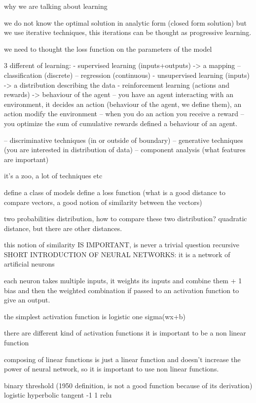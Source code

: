 \documentclass{article}
\begin{document}
why we are talking about learning 

we do not know the optimal solution in analytic form (closed form solution)
but we use iterative techniques, this iterations can be thought as progressive
learning. 

we need to thought the loss function on the parameters of the model 


3 different of learning:
- supervised learning (inputs+outputs) -> a mapping
 -- classification (discrete)
 -- regression (continuous)
- unsupervised learning (inputs) -> a distribution describing the data
- reinforcement learning (actions and rewards) -> behaviour of the agent
--  you have an agent interacting with an environment, it decides an action
(behaviour of the agent, we define them), an action modify the environment 
-- when you do an action you receive a reward 
-- you optimize the sum of cumulative rewards defined a behaviour of an agent.

-- discriminative techniques (in or outside of boundary)
-- generative techniques (you are interested in distribution of data)
-- component analysis (what features are important)

it's a zoo, a lot of techniques etc 

define a class of models 
define a loss function (what is a good distance to compare vectors, a good
notion of similarity between the vectors)

two probabilities distribution, how to compare these two distribution?
quadratic distance, but there are other distances.

this notion of similarity IS IMPORTANT, is never a trivial question 
recursive
SHORT INTRODUCTION OF NEURAL NETWORKS:
it is a network of artificial neurons

each neuron takes multiple inputs, it weights its inputs and combine them + 1
bias and then the weighted combination if passed to an activation function to
give an output.

the simplest activation function is logistic one 
sigma(wx+b)

there are different kind of activation functions
it is important to be a non linear function 

composing of linear functions is just a linear function and doesn't increase
the power of neural network, so it is important to use non linear functions.

binary threshold (1950 definition, is not a good function because of its
derivation)
logistic 
hyperbolic tangent -1 1 
relu
\end{document}
